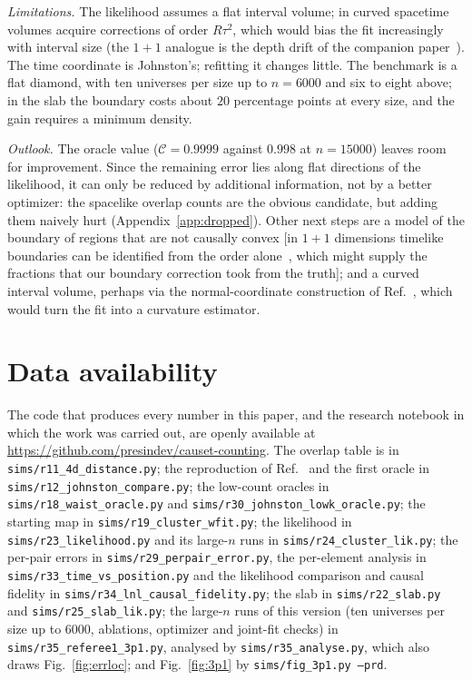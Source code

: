 \documentclass[prd,twocolumn,superscriptaddress,nofootinbib,amsmath,amssymb,floatfix]{revtex4-2}
\begin{document}
\emph{Limitations.} The likelihood assumes a flat interval volume; in curved spacetime volumes acquire corrections of order $R\tau^2$, which would bias the fit increasingly with interval size (the $1+1$ analogue is the depth drift of the companion paper~\cite{Toolkit}). The time coordinate is Johnston's; refitting it changes little. The benchmark is a flat diamond, with ten universes per size up to $n=6000$ and six to eight above; in the slab the boundary costs about $20$ percentage points at every size, and the gain requires a minimum density.

\emph{Outlook.} The oracle value ($\mathcal C=0.9999$ against $0.998$ at $n=15000$) leaves room for improvement. Since the remaining error lies along flat directions of the likelihood, it can only be reduced by additional information, not by a better optimizer: the spacelike overlap counts are the obvious candidate, but adding them naively hurt (Appendix~\ref{app:dropped}). Other next steps are a model of the boundary of regions that are not causally convex [in $1+1$ dimensions timelike boundaries can be identified from the order alone~\cite{Cunningham18}, which might supply the fractions that our boundary correction took from the truth]; and a curved interval volume, perhaps via the normal-coordinate construction of Ref.~\cite{Madsen26}, which would turn the fit into a curvature estimator.

\section*{Data availability}
The code that produces every number in this paper, and the research notebook in which the work was carried out, are openly available at \url{https://github.com/presindev/causet-counting}. The overlap table is in \texttt{sims/r11\_4d\_distance.py}; the reproduction of Ref.~\cite{Johnston25} and the first oracle in \texttt{sims/r12\_johnston\_compare.py}; the low-count oracles in \texttt{sims/r18\_waist\_oracle.py} and \texttt{sims/r30\_johnston\_lowk\_oracle.py}; the starting map in \texttt{sims/r19\_cluster\_wfit.py}; the likelihood in \texttt{sims/r23\_likelihood.py} and its large-$n$ runs in \texttt{sims/r24\_cluster\_lik.py}; the per-pair errors in \texttt{sims/r29\_perpair\_error.py}, the per-element analysis in \texttt{sims/r33\_time\_vs\_position.py} and the likelihood comparison and causal fidelity in \texttt{sims/r34\_lnl\_causal\_fidelity.py}; the slab in \texttt{sims/r22\_slab.py} and \texttt{sims/r25\_slab\_lik.py}; the large-$n$ runs of this version (ten universes per size up to $6000$, ablations, optimizer and joint-fit checks) in \texttt{sims/r35\_referee1\_3p1.py}, analysed by \texttt{sims/r35\_analyse.py}, which also draws Fig.~\ref{fig:errloc}; and Fig.~\ref{fig:3p1} by \texttt{sims/fig\_3p1.py --prd}.
\end{document}
